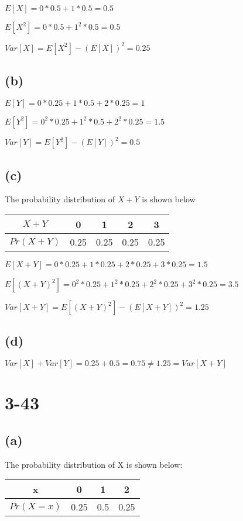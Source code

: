 \documentclass[12pt]{article}
\begin{document}
\begin{spacing}{2.0}
$E[X]=0*0.5 +1*0.5=0.5$

$E[X^2]= 0*0.5 +1^2*0.5=0.5$

$Var[X]= E[X^2]- (E[X])^2=0.25$

\subsection*{(b)}

$E[Y]=0*0.25 +1*0.5+ 2*0.25= 1$

$E[Y^2]= 0^2*0.25 +1^2*0.5+ 2^2*0.25= 1.5$

$Var[Y]= E[Y^2]- (E[Y])^2=0.5$

\subsection*{(c)}

The probability distribution of $X+Y$ is shown below

\begin{tabular}{|c|c|c|c|c|}
  \hline
  $X+Y$ & 0 & 1 & 2 & 3 \\
  \hline
  $Pr(X+Y)$ & 0.25 & 0.25 & 0.25 & 0.25 \\
  \hline
\end{tabular}

$E[X+Y]=0*0.25+ 1*0.25 +2*0.25 +3*0.25=1.5$

$E[(X+Y)^2]= 0^2*0.25+ 1^2*0.25 +2^2*0.25 +3^2*0.25= 3.5$

$Var[X+Y]=E[(X+Y)^2]- (E[X+Y])^2= 1.25$

\subsection*{(d)}

$Var[X]+ Var[Y]= 0.25+0.5=0.75 \ne 1.25=Var[X+Y]$

\section*{3-43}

\subsection*{(a)}

The probability distribution of X is shown below:

\begin{tabular}{|c|c|c|c|}
  \hline
  x & 0 & 1 & 2 \\
  \hline
  $Pr(X=x)$ & 0.25 & 0.5 & 0.25 \\
  \hline
\end{tabular}


\end{spacing}
\end{document}
